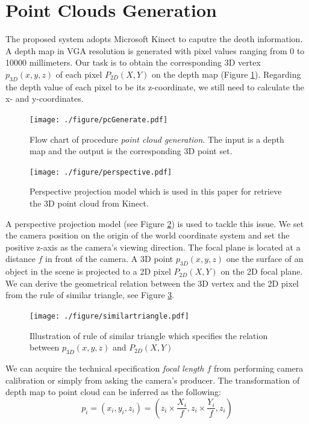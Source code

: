\section{Point Clouds Generation}
\label{s:point cloud gen}
The proposed system adopts Microsoft Kinect to caputre the deoth information. A depth map in VGA resolution is generated with pixel values ranging from 0 to 10000 millimeters. Our task is to obtain the corresponding 3D vertex $p_{3D}(x,y,z)$ of each pixel $P_{2D}(X,Y)$ on the depth map (Figure \ref{f:pcGenerate}). Regarding the depth value of each pixel to be its z-coordinate, we still need to calculate the x- and y-coordinates.
\begin{figure}
\centering
\texttt{[image: ./figure/pcGenerate.pdf]}
\caption{Flow chart of procedure \emph{point cloud generation}. The input is a depth map and the output is the corresponding 3D point set.}
\label{f:pcGenerate}
\end{figure}
\begin{figure}
\centering
\texttt{[image: ./figure/perspective.pdf]}
\caption{Perspective projection model which is used in this paper for retrieve the 3D point cloud from Kinect.}
\label{f:perspective}
\end{figure}
A perspective projection model (see Figure \ref{f:perspective}) is used to tackle this issue. We set the camera position on the origin of the world coordinate system and set the positive z-axis as the camera's viewing direction. The focal plane is located at a distance $f$ in front of the camera. A 3D point $p_{3D}(x,y,z)$ one the surface of an object in the scene is projected to a 2D pixel $P_{2D}(X,Y)$ on the 2D focal plane. We can derive the geometrical relation between the 3D vertex and the 2D pixel from the rule of similar triangle, see Figure \ref{f:similartri}.
\begin{figure}
\centering
\texttt{[image: ./figure/similartriangle.pdf]}
\caption{Illustration of rule of similar triangle which specifies the relation between $p_{3D}(x,y,z)$ and $P_{2D}(X,Y)$}
\label{f:similartri}
\end{figure}
We can acquire the technical specification \emph{focal length $f$} from performing camera calibration or simply from asking the camera's producer. The transformation of depth map to point cloud can be inferred as the following:
\begin{equation}
p_{i} = (x_{i},y_{i},z_{i}) = (z_{i}\times\dfrac{X_{i}}{f}, z_{i}\times\dfrac{Y_{i}}{f}, z_{i})
\end{equation}

